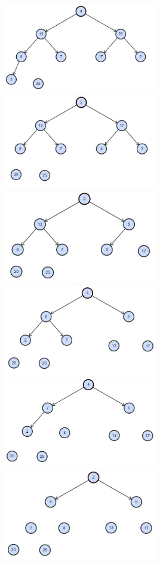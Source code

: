 \documentclass[addpoints,11pt]{exam}
\begin{document}
\begin{questions}
\begin{solutionorbox}\\
	\includegraphics[width=0.5\textwidth]{heapsort1.jpg}
	\includegraphics[width=0.5\textwidth]{heapsort2.jpg}
	\includegraphics[width=0.5\textwidth]{heapsort3.jpg}
	\includegraphics[width=0.5\textwidth]{heapsort4.jpg}
	\includegraphics[width=0.5\textwidth]{heapsort5.jpg}
	\includegraphics[width=0.5\textwidth]{heapsort6.jpg}

\end{solutionorbox}
\end{questions}
\end{document}
